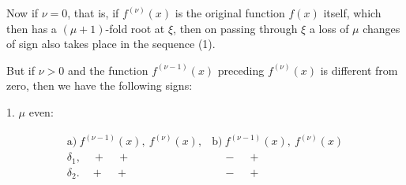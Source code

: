 Now if $\nu = 0$, that is, if $f^{(\nu)}(x)$ is the original function $f(x)$ itself, which then has a $(\mu+1)$-fold root at $\xi$, then on passing through $\xi$ a loss of $\mu$ changes of sign also takes place in the sequence (1).

But if $\nu > 0$ and the function $f^{(\nu-1)}(x)$ preceding $f^{(\nu)}(x)$ is different from zero, then we have the following signs:

1. $\mu$ even:

\[
\begin{array}{ll}
\text{a)}\ f^{(\nu-1)}(x),\ f^{(\nu)}(x), & \text{b)}\ f^{(\nu-1)}(x),\ f^{(\nu)}(x) \\[2pt]
\delta_1,\quad + \quad + & \quad - \quad + \\[2pt]
\delta_2.\quad + \quad + & \quad - \quad +
\end{array}
\]
